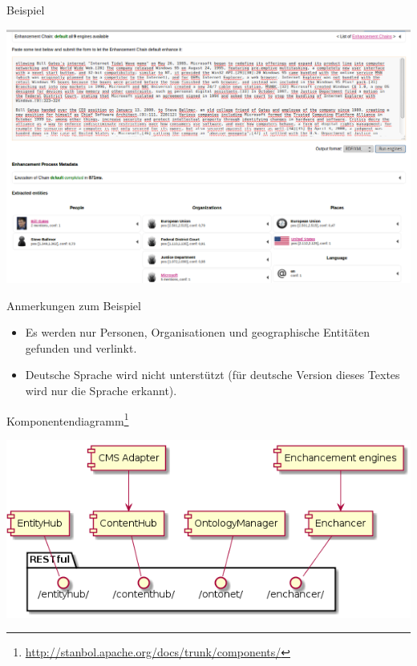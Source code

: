 \documentclass{beamer}
\begin{document}
  \begin{frame}[c]{Beispiel}
  \begin{center}
  \includegraphics[width=0.7\linewidth]{pics/stanbol-enchancer.png}
  \end{center}
  \end{frame}
  
  \begin{frame}{Anmerkungen zum Beispiel}
  \begin{itemize}
  \item Es werden nur Personen, Organisationen und geographische Entitäten gefunden und verlinkt.
  \item Deutsche Sprache wird nicht unterstützt (für deutsche Version dieses Textes wird nur die Sprache erkannt).
  \end{itemize}
  \end{frame}
  
  \begin{frame}[c]{Komponentendiagramm\footnote{\url{http://stanbol.apache.org/docs/trunk/components/}}}
  \begin{center}
  \includegraphics[width=0.7\linewidth]{diagramms/komponenten.png}
  \end{center}
  \end{frame}
  
\end{document}
